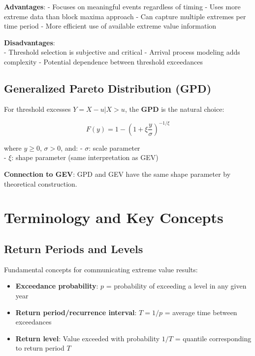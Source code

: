 \documentclass[
  letterpaper,
  DIV=11,
  numbers=noendperiod]{scrreprt}
\providecommand{\tightlist}{%
  \setlength{\itemsep}{0pt}\setlength{\parskip}{0pt}}
\begin{document}
\textbf{Advantages}: - Focuses on meaningful events regardless of timing
- Uses more extreme data than block maxima approach - Can capture
multiple extremes per time period - More efficient use of available
extreme value information

\textbf{Disadvantages}:\\
- Threshold selection is subjective and critical - Arrival process
modeling adds complexity - Potential dependence between threshold
exceedances

\subsection{Generalized Pareto Distribution
(GPD)}\label{generalized-pareto-distribution-gpd}

For threshold excesses \(Y = X - u | X > u\), the \textbf{GPD} is the
natural choice:

\[F(y) = 1 - \left(1 + \xi \frac{y}{\sigma}\right)^{-1/\xi}\]

where \(y \geq 0\), \(\sigma > 0\), and: - \(\sigma\): scale parameter\\
- \(\xi\): shape parameter (same interpretation as GEV)

\textbf{Connection to GEV}: GPD and GEV have the same shape parameter by
theoretical construction.

\section{Terminology and Key
Concepts}\label{terminology-and-key-concepts}

\subsection{Return Periods and Levels}\label{return-periods-and-levels}

Fundamental concepts for communicating extreme value results:

\begin{itemize}
\tightlist
\item
  \textbf{Exceedance probability}: \(p\) = probability of exceeding a
  level in any given year
\item
  \textbf{Return period/recurrence interval}: \(T = 1/p\) = average time
  between exceedances\\
\item
  \textbf{Return level}: Value exceeded with probability \(1/T\) =
  quantile corresponding to return period \(T\)
\end{itemize}
\end{document}
